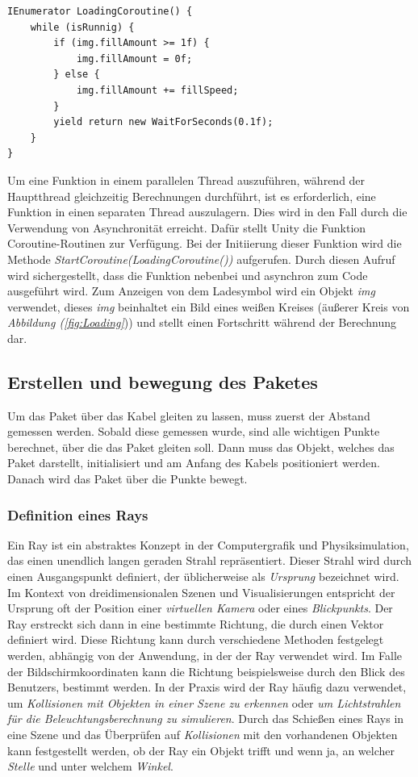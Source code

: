 \begin{lstlisting}[style=csharp, caption={Code zum ausführen des lade Symbols}, label=code:LoadingCoroutine]
IEnumerator LoadingCoroutine() {
    while (isRunnig) {
        if (img.fillAmount >= 1f) {
            img.fillAmount = 0f;
        } else {
            img.fillAmount += fillSpeed;
        }
        yield return new WaitForSeconds(0.1f);
    }
}
\end{lstlisting}
Um eine Funktion in einem parallelen Thread auszuführen, während der Hauptthread gleichzeitig Berechnungen durchführt, ist es erforderlich, eine Funktion in einen separaten Thread auszulagern. Dies wird in den Fall durch die Verwendung von Asynchronität erreicht. Dafür stellt Unity die Funktion Coroutine-Routinen zur Verfügung. Bei der Initiierung dieser Funktion wird die Methode \textit{StartCoroutine(LoadingCoroutine())} aufgerufen. Durch diesen Aufruf wird sichergestellt, dass die Funktion nebenbei und asynchron zum Code ausgeführt wird. Zum Anzeigen von dem Ladesymbol wird ein Objekt \textit{img} verwendet, dieses \textit{img} beinhaltet ein Bild eines weißen Kreises (äußerer Kreis von \textit{Abbildung (\ref{fig:Loading}})) und stellt einen Fortschritt während der Berechnung dar.


\subsection{Erstellen und bewegung des Paketes}
Um das Paket über das Kabel gleiten zu lassen, muss zuerst der Abstand gemessen werden. Sobald diese gemessen wurde, sind alle wichtigen Punkte berechnet, über die das Paket gleiten soll. Dann muss das Objekt, welches das Paket darstellt, initialisiert und am Anfang des Kabels positioniert werden. Danach wird das Paket über die Punkte bewegt.
\subsubsection{Definition eines Rays}
Ein Ray ist ein abstraktes Konzept in der Computergrafik und Physiksimulation, das einen unendlich langen geraden Strahl repräsentiert. Dieser Strahl wird durch einen Ausgangspunkt definiert, der üblicherweise als \textit{Ursprung} bezeichnet wird. Im Kontext von dreidimensionalen Szenen und Visualisierungen entspricht der Ursprung oft der Position einer \textit{virtuellen Kamera} oder eines \textit{Blickpunkts}. Der Ray erstreckt sich dann in eine bestimmte Richtung, die durch einen Vektor definiert wird. Diese Richtung kann durch verschiedene Methoden festgelegt werden, abhängig von der Anwendung, in der der Ray verwendet wird. Im Falle der Bildschirmkoordinaten kann die Richtung beispielsweise durch  den Blick des Benutzers, bestimmt werden. In der Praxis wird der Ray häufig dazu verwendet, um \textit{Kollisionen mit Objekten in einer Szene zu erkennen} oder \textit{um Lichtstrahlen für die Beleuchtungsberechnung zu simulieren}. Durch das Schießen eines Rays in eine Szene und das Überprüfen auf \textit{Kollisionen} mit den vorhandenen Objekten kann festgestellt werden, ob der Ray ein Objekt trifft und wenn ja, an welcher \textit{Stelle} und unter welchem \textit{Winkel}.\\
